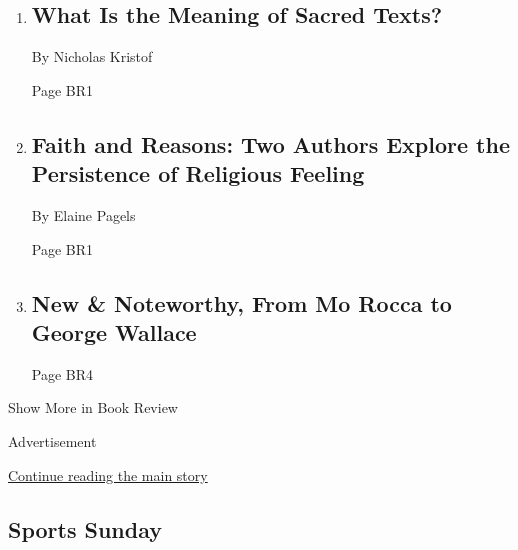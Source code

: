 \begin{enumerate}
\def\labelenumi{\arabic{enumi}.}
\item
  \href{/2019/11/11/books/review/the-lost-art-of-scripture-karen-armstrong.html}{}

  \hypertarget{what-is-the-meaning-of-sacred-texts}{%
  \subsection{What Is the Meaning of Sacred
  Texts?}\label{what-is-the-meaning-of-sacred-texts}}

  By Nicholas Kristof

  Page BR1
\item
  \href{/2019/11/11/books/review/believers-faith-in-human-nature-melvin-konners.html}{}

  \hypertarget{faith-and-reasons-two-authors-explore-the-persistence-of-religious-feeling}{%
  \subsection{Faith and Reasons: Two Authors Explore the Persistence of
  Religious
  Feeling}\label{faith-and-reasons-two-authors-explore-the-persistence-of-religious-feeling}}

  By Elaine Pagels

  Page BR1
\item
  \href{/2019/11/26/books/review/new-this-week.html}{}

  \hypertarget{new--noteworthy-from-mo-rocca-to-george-wallace}{%
  \subsection{New \& Noteworthy, From Mo Rocca to George
  Wallace}\label{new--noteworthy-from-mo-rocca-to-george-wallace}}

  Page BR4
\end{enumerate}

Show More in Book Review

Advertisement

\protect\hyperlink{after-mid6}{Continue reading the main story}

\hypertarget{sports-sunday}{%
\subsection{Sports Sunday}\label{sports-sunday}}

